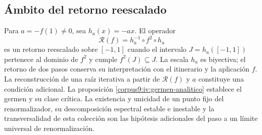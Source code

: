 \subsection{Ámbito del retorno reescalado}
Para \(a=-f(1)\ne0\), sea \(h_a(x)=-ax\). El operador
\[
 \mathcal R(f)=h_a^{-1}\circ f^2\circ h_a
\]
es un retorno reescalado sobre \([-1,1]\) cuando el intervalo
\(J=h_a([-1,1])\) pertenece al dominio de \(f^2\) y cumple
\(f^2(J)\subseteq J\). La escala \(h_a\) es biyectiva;
el retorno de dos pasos conserva su interpretación con el
itinerario y la aplicación \(f\). La reconstrucción de una
raíz iterativa a partir de \(\mathcal R(f)\) y \(a\) constituye
una condición adicional. La proposición
\ref{corpus9:iv:germen-analitico} establece el germen y su
clase crítica. La existencia y unicidad de un punto fijo del
renormalizador, su descomposición espectral estable e inestable
y la transversalidad de esta colección son las hipótesis
adicionales del paso a un límite universal de renormalización.
